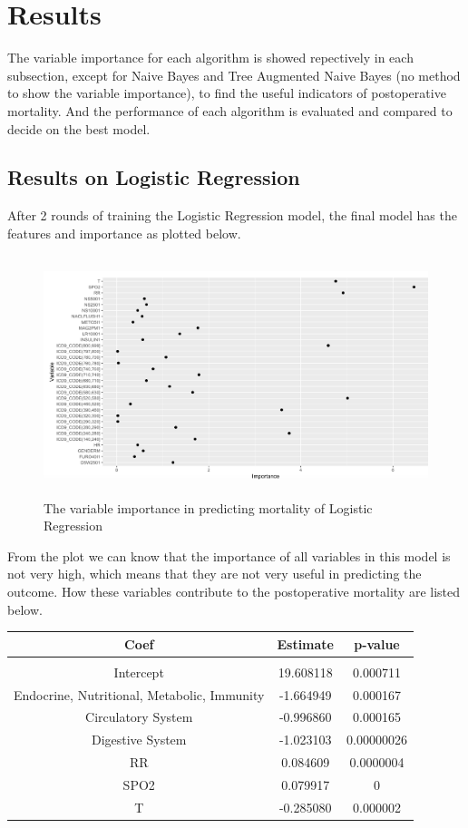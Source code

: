 \documentclass[twoside,11pt]{article}
\begin{document}
\section{Results} \label{results}
The variable importance for each algorithm is showed repectively in each subsection, except for Naive Bayes and Tree Augmented Naive Bayes (no method to show the variable importance), to find the useful indicators of postoperative mortality. And the performance of each algorithm is evaluated and compared to decide on the best model.

\subsection{Results on Logistic Regression} 
After 2 rounds of training the Logistic Regression model, the final model has the features and importance as plotted below.

\begin{figure}[htbp]
  \centering 
  \includegraphics[height=7cm, width=14cm]{fig5} 
  \caption{The variable importance in predicting mortality of Logistic Regression}
  \label{fig5} 
\end{figure} 

From the plot we can know that the importance of all variables in this model is not very high, which means that they are not very useful in predicting the outcome. How these variables contribute to the postoperative mortality are listed below.

\begin{table}[htbp]
  \centering 
  \begin{tabular}{|c|c|c|} 
     Coef & Estimate & p-value\\ 
    \hline \\[-11pt]
    Intercept & 19.608118 & 0.000711\\ 
    Endocrine, Nutritional, Metabolic, Immunity & -1.664949 & 0.000167\\ 
    Circulatory System & -0.996860 & 0.000165\\
    Digestive System & -1.023103 & 0.00000026\\
    RR & 0.084609 & 0.0000004\\ 
    SPO2 & 0.079917 & 0\\
    T & -0.285080 & 0.000002\\ \hline 
  \end{tabular}
\end{table}
\end{document}
